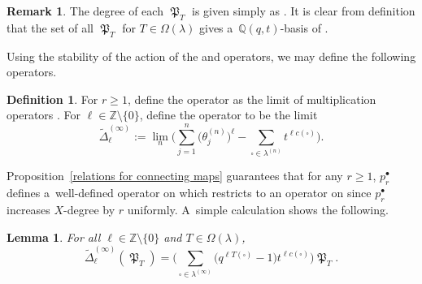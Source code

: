 \documentclass[10pt,a4paper]{amsart}
\numberwithin{equation}{section}
\newtheorem{Lemma}[Theorem]{Lemma}
\theoremstyle{definition}
\newtheorem{Definition}[Theorem]{Definition}
\newtheorem{Remark}[Theorem]{Remark}
\DeclareMathOperator{\MacD}{\mathfrak{P}}
\begin{document}
{\samepage\begin{Remark}
 The degree of each $\MacD_T$ is given simply as
 \smash{$
 \mathrm{deg}(\MacD_T) = \deg(T) = \sum_{\square \in \lambda^{(\infty)}} T(\square)$}.
 It is clear from definition that the set of all $\MacD_T$ for $T \in \Omega(\lambda)$ gives a~$\mathbb{Q}(q,t)$-basis of .
\end{Remark}

Using the stability of the action of the  and  operators, we may define the following operators.}

\begin{Definition}\label{MacD operator Definition}
 For $r \geq 1$, define the operator  as the limit of multiplication operators .
 For $\ell \in \mathbb{Z}\setminus \{0\}$, define the operator  to be the limit
 \[
 \widetilde{\Delta}_{\ell}^{(\infty)}:= \lim_n \Biggl(\sum_{j=1}^{n}\bigl(\theta^{(n)}_j\bigr)^{\ell} - \sum_{\square \in \lambda^{(n)}} t^{\ell c(\square)} \Biggr).
 \]
\end{Definition}

Proposition~\ref{relations for connecting maps} guarantees that for any $r\geq 1$, $p_r^{\bullet}$ defines a~well-defined operator on  which restricts to an operator on  since $p_r^{\bullet}$ increases $X$-degree by $r$ uniformly. A~simple calculation shows the following.

\begin{Lemma}\label{action of MacD operator}
 For all $\ell \in \mathbb{Z}\setminus \{0\}$ and $T \in \Omega(\lambda)$,
 \[
 \widetilde{\Delta}_{\ell}^{(\infty)}( \MacD_T)= \biggl( \sum_{\square \in \lambda^{(\infty)}} \bigl(q^{\ell T(\square)} -1\bigr)t^{\ell c(\square)} \biggr) \MacD_T.
 \]

\end{Lemma}
\end{document}

